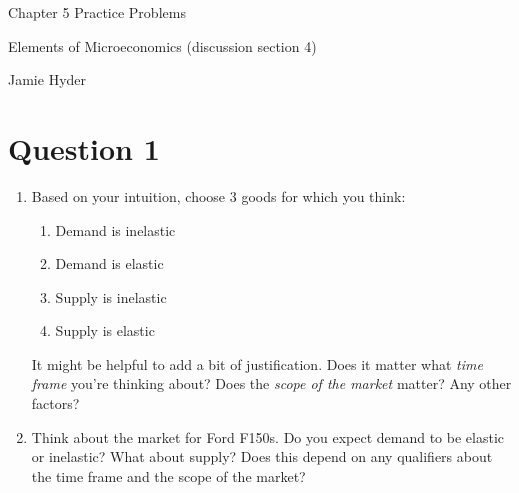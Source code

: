 \documentclass[12pt]{article}
\begin{document}
\begin{center}
\Large Chapter 5 Practice Problems

\medskip

\normalsize Elements of Microeconomics (discussion section 4)

\medskip

\small Jamie Hyder
\end{center}

\medskip
\section*{Question 1}
\begin{enumerate}
\item Based on your intuition, choose 3 goods for which you think:
\begin{enumerate}
    \item Demand is inelastic
    \item Demand is elastic
    \item Supply is inelastic
    \item Supply is elastic
\end{enumerate}
It might be helpful to add a bit of justification. Does it matter what \textit{time frame} you're thinking about? Does the \textit{scope of the market} matter? Any other factors?

\vspace{5mm}

\item Think about the market for Ford F150s. Do you expect demand to be elastic or inelastic? What about supply? Does this depend on any qualifiers about the time frame and the scope of the market?

\vspace{5mm}

\end{enumerate}
\end{document}
